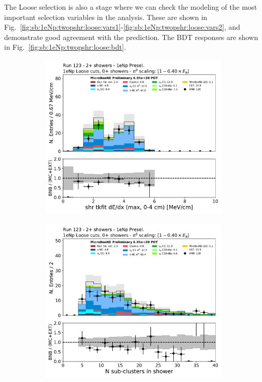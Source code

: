 The Loose selection is also a stage where we can check the modeling of the most important selection variables in the analysis. These are shown in Fig.~\ref{fig:sb:1eNp:twopshr:loose:vars1}-\ref{fig:sb:1eNp:twopshr:loose:vars2}, and demonstrate good agreement with the prediction. The BDT responses are shown in Fig.~\ref{fig:sb:1eNp:twopshr:loose:bdt}.

\begin{figure}[H]
    \begin{center}
    \begin{subfigure}{0.45\textwidth}
    \includegraphics[width=1.00\textwidth]{Sidebands/Figures/1eNp/TwoShower/TwoPShr_NP_NPLAllShr_pi0e040/shr_tkfit_dedx_max.pdf}
    \end{subfigure}
    \begin{subfigure}{0.45\textwidth}
    \includegraphics[width=1.00\textwidth]{Sidebands/Figures/1eNp/TwoShower/TwoPShr_NP_NPLAllShr_pi0e040/subcluster.pdf}

\end{subfigure}
\end{center}
\end{figure}
